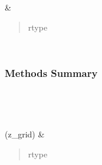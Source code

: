 \documentclass[letterpaper,10pt,english]{sphinxmanual}
\begin{document}
\begin{fulllineitems}
\begin{savenotes}
\begin{longtable}[c]{}
%
{}\\
\hline

\endhead

\hline
{}\\
\endfoot

\endlastfoot

\sphinxAtStartPar
{\hyperref[\detokenize{api/seyfert.cosmology.bias.Bias:seyfert.cosmology.bias.Bias.has_output}]{}}
&
\sphinxAtStartPar
\begin{quote}\begin{description}
\item[{rtype}] \leavevmode
\sphinxAtStartPar
{}

\end{description}\end{quote}

\\
\hline
\end{longtable}\sphinxatlongtableend\end{savenotes}
\subsubsection*{Methods Summary}


\begin{savenotes}\sphinxatlongtablestart\begin{longtable}[c]{}
\hline

\endfirsthead

%
{}\\
\hline

\endhead

\hline
{}\\
\endfoot

\endlastfoot

\sphinxAtStartPar
{\hyperref[\detokenize{api/seyfert.cosmology.bias.Bias:seyfert.cosmology.bias.Bias.evaluateBias}]{}}(z\_grid)
&
\sphinxAtStartPar
\begin{quote}\begin{description}
\item[{rtype}] \leavevmode
\sphinxAtStartPar
{}


\end{description}
\end{quote}
\end{longtable}
\end{savenotes}
\end{fulllineitems}
\end{document}
